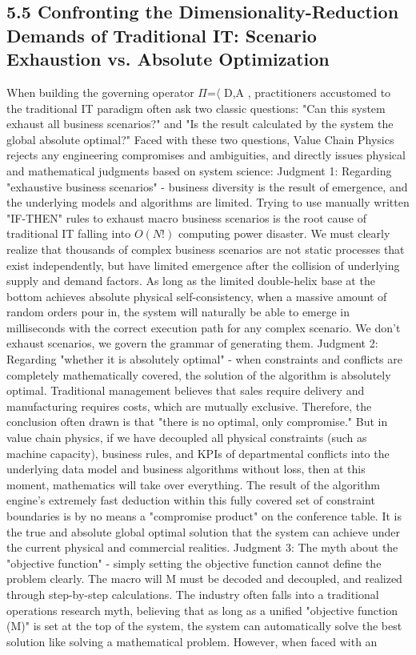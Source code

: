 \documentclass[11pt,a4paper]{article}
\begin{document}
\subsection*{5.5 Confronting the Dimensionality-Reduction Demands of Traditional IT: Scenario Exhaustion vs. Absolute Optimization}


When building the governing operator $\Pi$=$\langle$ D,A , practitioners accustomed to the traditional IT paradigm often ask two classic questions: "Can this system exhaust all business scenarios?" and "Is the result calculated by the system the global absolute optimal?" Faced with these two questions, Value Chain Physics rejects any engineering compromises and ambiguities, and directly issues physical and mathematical judgments based on system science: Judgment 1: Regarding "exhaustive business scenarios" - business diversity is the result of emergence, and the underlying models and algorithms are limited. Trying to use manually written "IF-THEN" rules to exhaust macro business scenarios is the root cause of traditional IT falling into $O(N!)$ computing power disaster. We must clearly realize that thousands of complex business scenarios are not static processes that exist independently, but have limited emergence after the collision of underlying supply and demand factors. As long as the limited double-helix base at the bottom achieves absolute physical self-consistency, when a massive amount of random orders pour in, the system will naturally be able to emerge in milliseconds with the correct execution path for any complex scenario. We don’t exhaust scenarios, we govern the grammar of generating them. Judgment 2: Regarding "whether it is absolutely optimal" - when constraints and conflicts are completely mathematically covered, the solution of the algorithm is absolutely optimal. Traditional management believes that sales require delivery and manufacturing requires costs, which are mutually exclusive. Therefore, the conclusion often drawn is that "there is no optimal, only compromise." But in value chain physics, if we have decoupled all physical constraints (such as machine capacity), business rules, and KPIs of departmental conflicts into the underlying data model and business algorithms without loss, then at this moment, mathematics will take over everything. The result of the algorithm engine's extremely fast deduction within this fully covered set of constraint boundaries is by no means a "compromise product" on the conference table. It is the true and absolute global optimal solution that the system can achieve under the current physical and commercial realities. Judgment 3: The myth about the "objective function" - simply setting the objective function cannot define the problem clearly. The macro will M must be decoded and decoupled, and realized through step-by-step calculations. The industry often falls into a traditional operations research myth, believing that as long as a unified "objective function (M)" is set at the top of the system, the system can automatically solve the best solution like solving a mathematical problem. However, when faced with an 
\end{document}
